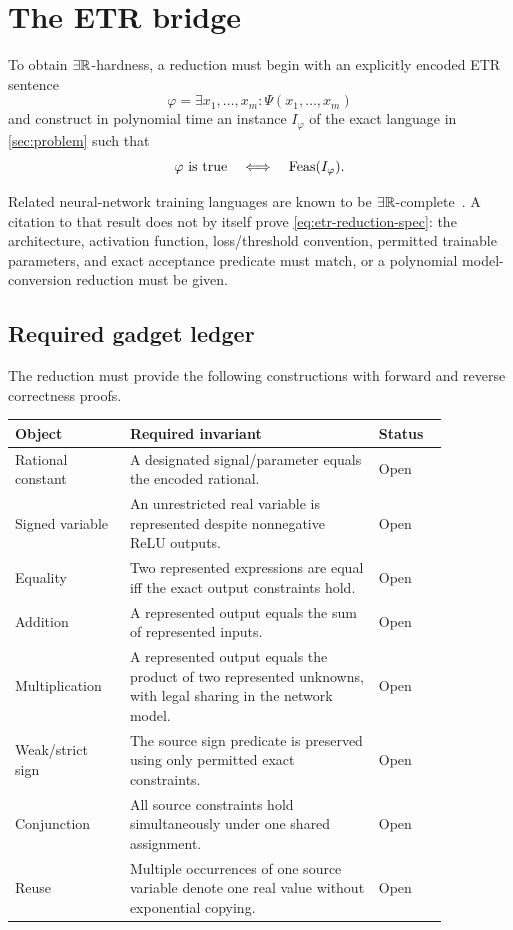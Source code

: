 \section{The ETR bridge}
\label{sec:etr-reduction}

To obtain \(\exists\mathbb{R}\)-hardness, a reduction must begin with an explicitly
encoded ETR sentence
\begin{equation}
  \varphi=\exists x_1,\ldots,x_m:\Psi(x_1,\ldots,x_m)
\end{equation}
and construct in polynomial time an instance \(I_\varphi\) of the exact
language in \cref{sec:problem} such that
\begin{equation}
  \varphi\text{ is true}
  \quad\Longleftrightarrow\quad
  \operatorname{Feas}(I_\varphi).
  \label{eq:etr-reduction-spec}
\end{equation}

Related neural-network training languages are known to be
\(\exists\mathbb{R}\)-complete~\cite{AbrahamsenKleistMiltzow2021}.  A citation to that
result does not by itself prove \cref{eq:etr-reduction-spec}: the architecture,
activation function, loss/threshold convention, permitted trainable
parameters, and exact acceptance predicate must match, or a polynomial
model-conversion reduction must be given.

\subsection{Required gadget ledger}

The reduction must provide the following constructions with forward and
reverse correctness proofs.

\begin{center}
\begin{tabular}{p{0.22\linewidth}p{0.50\linewidth}p{0.14\linewidth}}
\toprule
Object & Required invariant & Status\\
\midrule
Rational constant & A designated signal/parameter equals the encoded rational. & Open\\
Signed variable & An unrestricted real variable is represented despite nonnegative ReLU outputs. & Open\\
Equality & Two represented expressions are equal iff the exact output constraints hold. & Open\\
Addition & A represented output equals the sum of represented inputs. & Open\\
Multiplication & A represented output equals the product of two represented unknowns, with legal sharing in the network model. & Open\\
Weak/strict sign & The source sign predicate is preserved using only permitted exact constraints. & Open\\
Conjunction & All source constraints hold simultaneously under one shared assignment. & Open\\
Reuse & Multiple occurrences of one source variable denote one real value without exponential copying. & Open\\
\bottomrule
\end{tabular}
\end{center}

